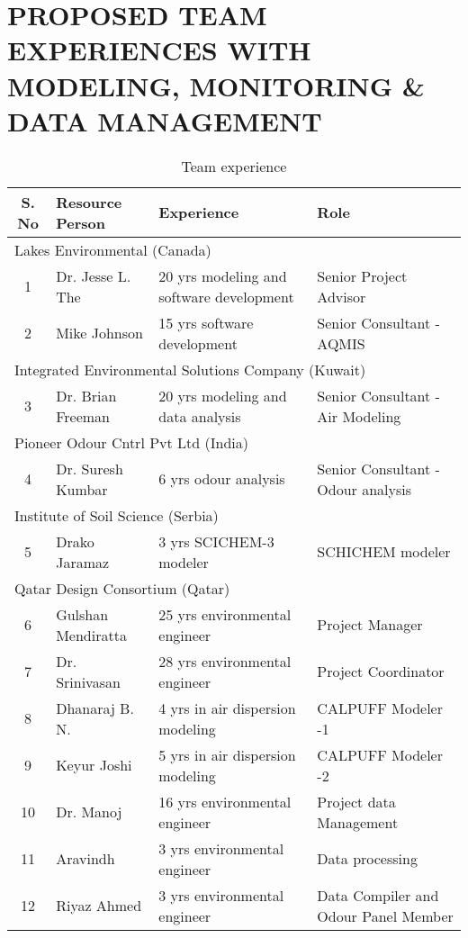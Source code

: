 \chapter{PROPOSED TEAM EXPERIENCES WITH MODELING, MONITORING \& DATA MANAGEMENT}


\begin{landscape}
\begin{table}[p]
\centering
\caption{Team experience}
\small
\label{tab:experience}
\begin{tabular}{|c|l|l|l|}
\hline
\textbf{S. No} & \textbf{Resource Person} & \textbf{Experience} & \textbf{Role} \\ \hline
\multicolumn{4}{|l|}{Lakes Environmental (Canada)} \\ \hline
1 & Dr. Jesse L. The & 20 yrs modeling and software development & Senior Project Advisor \\ \hline
2 & Mike Johnson & 15 yrs software development & Senior Consultant - AQMIS \\ \hline
\multicolumn{4}{|l|}{Integrated Environmental Solutions Company (Kuwait)} \\ \hline
3 & Dr. Brian Freeman & 20 yrs modeling and data analysis & Senior Consultant - Air Modeling \\ \hline
\multicolumn{4}{|l|}{Pioneer Odour Cntrl Pvt Ltd (India)} \\ \hline
4 & Dr. Suresh Kumbar & 6 yrs odour analysis & Senior Consultant - Odour analysis \\ \hline
\multicolumn{4}{|l|}{Institute of Soil Science (Serbia)} \\ \hline
5 & Drako Jaramaz & 3 yrs SCICHEM-3 modeler & SCHICHEM modeler \\ \hline
\multicolumn{4}{|l|}{Qatar Design Consortium (Qatar)} \\ \hline
6 & Gulshan Mendiratta & 25 yrs environmental engineer & Project Manager \\ \hline
7 & Dr. Srinivasan & 28 yrs environmental engineer & Project Coordinator \\ \hline
8 & Dhanaraj B. N. & 4 yrs in air dispersion modeling & CALPUFF Modeler -1 \\ \hline
9 & Keyur Joshi & 5 yrs in air dispersion modeling & CALPUFF Modeler -2 \\ \hline
10 & Dr. Manoj & 16 yrs environmental engineer & Project data Management \\ \hline
11 & Aravindh & 3 yrs environmental engineer & Data processing \\ \hline
12 & Riyaz Ahmed & 3 yrs environmental engineer & Data Compiler and Odour Panel Member \\ \hline

\end{tabular}
\end{table}
\end{landscape}
